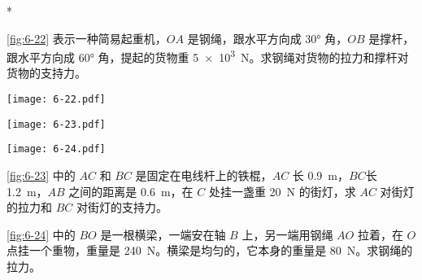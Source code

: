 \begin{Exercise}*
\begin{question}
  \item \cref{fig:6-22} 表示一种简易起重机，$OA$ 是钢绳，跟水平方向成 \ang{30} 角，$OB$ 是撑杆，跟水平方向成 \ang{60} 角，提起的货物重 \qty{5e3}{N}。求钢绳对货物的拉力和撑杆对货物的支持力。
  \begin{figurehere}
    \begin{minipage}[b]{0.38\linewidth}
      \centering
      \texttt{[image: 6-22.pdf]}
      \caption{}\label{fig:6-22}
    \end{minipage}%
    \begin{minipage}[b]{0.3\linewidth}
      \centering
      \texttt{[image: 6-23.pdf]}
      \caption{}\label{fig:6-23}
    \end{minipage}%
    \begin{minipage}[b]{0.3\linewidth}
      \centering
      \texttt{[image: 6-24.pdf]}
      \caption{}\label{fig:6-24}
    \end{minipage}
  \end{figurehere}




\item \cref{fig:6-23} 中的 $AC$ 和 $BC$ 是固定在电线杆上的铁棍，$AC$ 长 \qty{0.9}{m}，$BC$长 \qty{1.2}{m}，$AB$ 之间的距离是 \qty{0.6}{m}，在 $C$ 处挂一盏重 \qty{20}{N} 的街灯，求 $AC$ 对街灯的拉力和 $BC$ 对街灯的支持力。
\item \cref{fig:6-24} 中的 $BO$ 是一根横梁，一端安在轴 $B$ 上，另一端用钢绳 $AO$ 拉着，在 $O$ 点挂一个重物，重量是 \qty{240}{N}。横梁是均匀的，它本身的重量是 \qty{80}{N}。求钢绳的拉力。


\end{question}
\end{Exercise}
